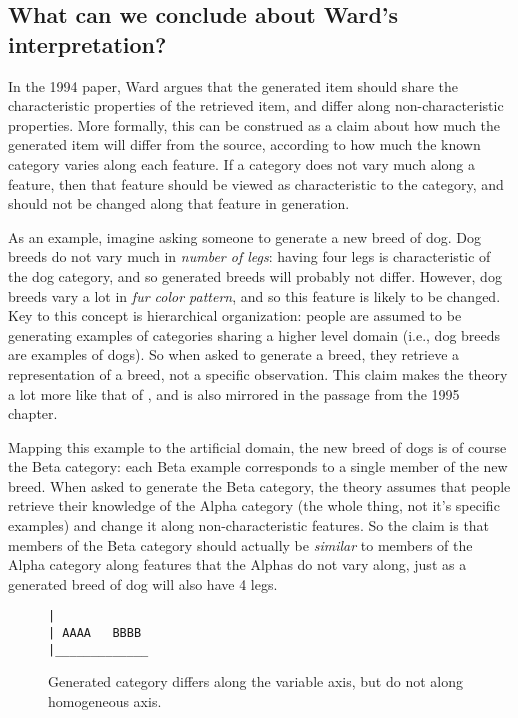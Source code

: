 \documentclass[12pt]{article}
\begin{document}
\subsection{What can we conclude about Ward's interpretation?}

In the 1994 paper, Ward argues that the generated item should share the characteristic properties of the retrieved item, and differ along non-characteristic properties. More formally, this can be construed as a claim about how much the generated item will differ from the source, according to how much the known category varies along each feature. If a category does not vary much along a feature, then that feature should be viewed as characteristic to the category, and should not be changed along that feature in generation. 

As an example, imagine asking someone to generate a new breed of dog. Dog breeds do not vary much in \textit{number of legs}: having four legs is characteristic of the dog category, and so generated breeds will probably not differ. However, dog breeds vary a lot in \textit{fur color pattern}, and so this feature is likely to be changed. Key to this concept is hierarchical organization: people are assumed to be generating examples of categories sharing a higher level domain (i.e., dog breeds are examples of dogs). So when asked to generate a breed, they retrieve a representation of a breed, not a specific observation. This claim makes the theory a lot more like that of \cite{jern2013probabilistic}, and is also mirrored in the passage from the 1995 chapter.

Mapping this example to the artificial domain, the new breed of dogs is of course the Beta category: each Beta example corresponds to a single member of the new breed. When asked to generate the Beta category, the theory assumes that people retrieve their knowledge of the Alpha category (the whole thing, not it's specific examples) and change it along non-characteristic features. So the claim is that members of the Beta category should actually be \textit{similar} to members of the Alpha category along features that the Alphas do not vary along, just as a generated breed of dog will also have 4 legs.

\begin{figure}
    \begin{center}
    \begin{BVerbatim}
|
| AAAA   BBBB
|_____________
    \end{BVerbatim}

    \caption{Generated category differs along the variable axis, but do not along homogeneous axis.}
    \end{center}
\end{figure}
\end{document}
